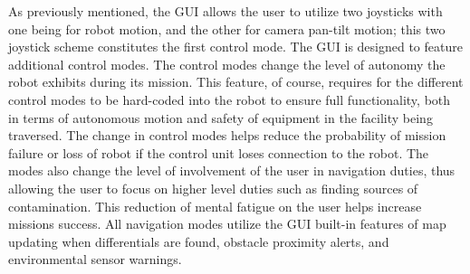 As previously mentioned, the GUI allows the user to utilize two joysticks with one being for robot motion, and the other for camera pan-tilt motion; this two joystick scheme constitutes the first control mode. The GUI is designed to feature additional control modes. The control modes change the level of autonomy the robot exhibits during its mission. This feature, of course, requires for the different control modes to be hard-coded into the robot to ensure full functionality, both in terms of autonomous motion and safety of equipment in the facility being traversed. The change in control modes helps reduce the probability of mission failure or loss of robot if the control unit loses connection to the robot. The modes also change the level of involvement of the user in navigation duties, thus allowing the user to focus on higher level duties such as finding sources of contamination. This reduction of mental fatigue on the user helps increase missions success. All navigation modes utilize the GUI built-in features of map updating when differentials are found, obstacle proximity alerts, and environmental sensor warnings. 


